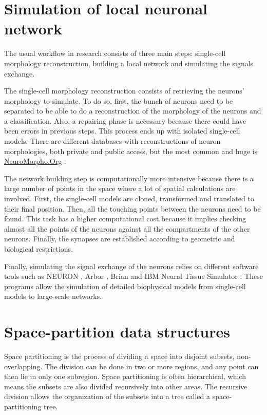 \section{Simulation of local neuronal network}
The usual workflow in research consists of three main steps: single-cell morphology reconstruction, building a local network and simulating the signals exchange.

The single-cell morphology reconstruction consists of retrieving the neurons' morphology to simulate. To do so, first, the bunch of neurons need to be separated to be able to do a reconstruction of the morphology of the neurons and a classification. Also, a repairing phase is necessary because there could have been errors in previous steps. This process ends up with isolated single-cell models. There are different databases with reconstructions of neuron morphologies, both private and public access, but the most common and huge is \href{https://neuromorpho.org/}{NeuroMorpho.Org} \cite{Neuromorpho1,Neuromorpho2}.

The network building step is computationally more intensive because there is a large number of points in the space where a lot of spatial calculations are involved. First, the single-cell models are cloned, transformed and translated to their final position. Then, all the touching points between the neurons need to be found. This task has a higher computational cost because it implies checking almost all the points of the neurons against all the compartments of the other neurons. Finally, the synapses are established according to geometric and biological restrictions.

Finally, simulating the signal exchange of the neurons relies on different software tools such as NEURON \cite{carnevale2006neuron}, Arbor \cite{8671560}, Brian \cite{Stimberg2019} and IBM Neural Tissue Simulator \cite{10.3389/fninf.2011.00015}. These programs allow the simulation of detailed biophysical models from single-cell models to large-scale networks.

\section{Space-partition data structures}
Space partitioning is the process of dividing a space into disjoint subsets, non-overlapping. The division can be done in two or more regions, and any point can then lie in only one subregion. Space partitioning is often hierarchical, which means the subsets are also divided recursively into other areas. The recursive division allows the organization of the subsets into a tree called a space-partitioning tree. 

